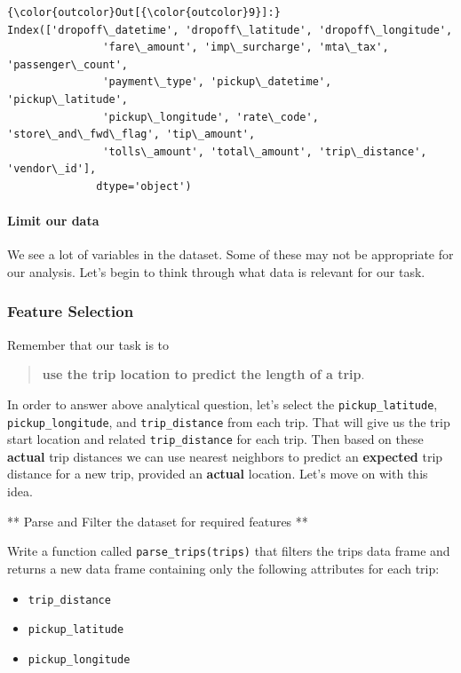 \documentclass[11pt]{article}
\providecommand{\tightlist}{%
      \setlength{\itemsep}{0pt}\setlength{\parskip}{0pt}}
\begin{document}
\begin{Verbatim}[commandchars=\\\{\}]
{\color{outcolor}Out[{\color{outcolor}9}]:} Index(['dropoff\_datetime', 'dropoff\_latitude', 'dropoff\_longitude',
               'fare\_amount', 'imp\_surcharge', 'mta\_tax', 'passenger\_count',
               'payment\_type', 'pickup\_datetime', 'pickup\_latitude',
               'pickup\_longitude', 'rate\_code', 'store\_and\_fwd\_flag', 'tip\_amount',
               'tolls\_amount', 'total\_amount', 'trip\_distance', 'vendor\_id'],
              dtype='object')
\end{Verbatim}
            
    \paragraph{Limit our data}\label{limit-our-data}

    We see a lot of variables in the dataset. Some of these may not be
appropriate for our analysis. Let's begin to think through what data is
relevant for our task.

    \subsubsection{Feature Selection}\label{feature-selection}

Remember that our task is to

\begin{quote}
\textbf{use the trip location to predict the length of a trip}.
\end{quote}

In order to answer above analytical question, let's select the
\texttt{pickup\_latitude}, \texttt{pickup\_longitude}, and
\texttt{trip\_distance} from each trip. That will give us the trip start
location and related \texttt{trip\_distance} for each trip. Then based
on these \textbf{actual} trip distances we can use nearest neighbors to
predict an \textbf{expected} trip distance for a new trip, provided an
\textbf{actual} location. Let's move on with this idea.

    ** Parse and Filter the dataset for required features **

    Write a function called \texttt{parse\_trips(trips)} that filters the
trips data frame and returns a new data frame containing only the
following attributes for each trip:

\begin{itemize}
\tightlist
\item
  \texttt{trip\_distance}
\item
  \texttt{pickup\_latitude}
\item
  \texttt{pickup\_longitude}
\end{itemize}
\end{document}
